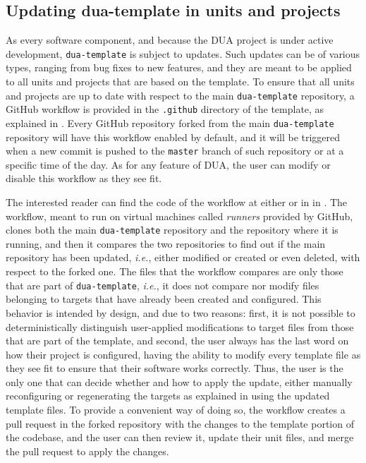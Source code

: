 \subsection{Updating dua-template in units and projects}
\label{sec:dua_template_update}
As every software component, and because the DUA project is under active development, \texttt{dua-template} is subject to updates. Such updates can be of various types, ranging from bug fixes to new features, and they are meant to be applied to all units and projects that are based on the template. To ensure that all units and projects are up to date with respect to the main \texttt{dua-template} repository, a GitHub workflow is provided in the \texttt{.github} directory of the template, as explained in . Every GitHub repository forked from the main \texttt{dua-template} repository will have this workflow enabled by default, and it will be triggered when a new commit is pushed to the \texttt{master} branch of such repository or at a specific time of the day. As for any feature of DUA, the user can modify or disable this workflow as they see fit.

The interested reader can find the code of the workflow at either \cite{masocco_dua-template_nodate} or in  in . The workflow, meant to run on virtual machines called \emph{runners} provided by GitHub, clones both the main \texttt{dua-template} repository and the repository where it is running, and then it compares the two repositories to find out if the main repository has been updated, \emph{i.e.}, either modified or created or even deleted, with respect to the forked one. The files that the workflow compares are only those that are part of \texttt{dua-template}, \emph{i.e.}, it does not compare nor modify files belonging to targets that have already been created and configured. This behavior is intended by design, and due to two reasons: first, it is not possible to deterministically distinguish user-applied modifications to target files from those that are part of the template, and second, the user always has the last word on how their project is configured, having the ability to modify every template file as they see fit to ensure that their software works correctly. Thus, the user is the only one that can decide whether and how to apply the update, either manually reconfiguring or regenerating the targets as explained in  using the updated template files. To provide a convenient way of doing so, the workflow creates a pull request in the forked repository with the changes to the template portion of the codebase, and the user can then review it, update their unit files, and merge the pull request to apply the changes.
